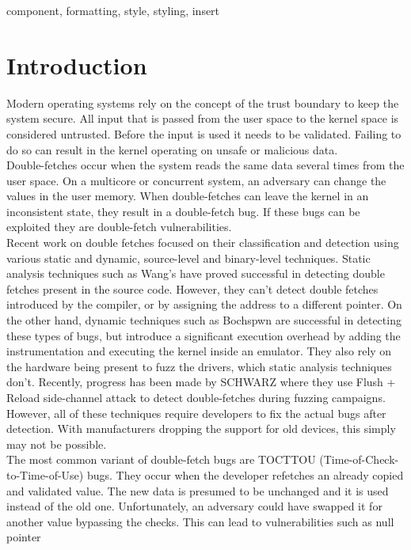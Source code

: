 \documentclass[conference]{IEEEtran}
\begin{document}
\begin{IEEEkeywords}
component, formatting, style, styling, insert
\end{IEEEkeywords}

\section{Introduction}
Modern operating systems rely on the concept of the trust boundary to keep the system secure. All input that is passed from the user space to the kernel space is considered untrusted. 
Before the input is used it needs to be validated. Failing to do so can result in the kernel operating on unsafe or malicious data.
\\
Double-fetches occur when the system reads the same data several times from the user space. On a multicore or concurrent system, an adversary can change the values in the user memory.
When double-fetches can leave the kernel in an inconsistent state, they result in a double-fetch bug. If these bugs can be exploited they are double-fetch vulnerabilities.
\\
Recent work on double fetches focused on their classification and detection using various static and dynamic, source-level and binary-level techniques. Static analysis techniques such as Wang's have proved successful in detecting
double fetches present in the source code. However, they can't detect double fetches introduced by the compiler, or by assigning the address to a different pointer. On the other hand, dynamic techniques such as Bochspwn are successful
in detecting these types of bugs, but introduce a significant execution overhead by adding the instrumentation and executing the kernel inside an emulator. They also rely on the hardware being present to fuzz the drivers, which static
analysis techniques don't. Recently, progress has been made by SCHWARZ where they use Flush + Reload side-channel attack to detect double-fetches during fuzzing campaigns. However, all of these techniques require
developers to fix the actual bugs after detection. With manufacturers dropping the support for old devices, this simply may not be possible.
\\
The most common variant of double-fetch bugs are TOCTTOU (Time-of-Check-to-Time-of-Use) bugs. They occur when the developer refetches an already copied and validated value. The new data is presumed
to be unchanged and it is used instead of the old one. Unfortunately, an adversary could have swapped it for another value bypassing the checks. This can lead to vulnerabilities such as null pointer
\end{document}
